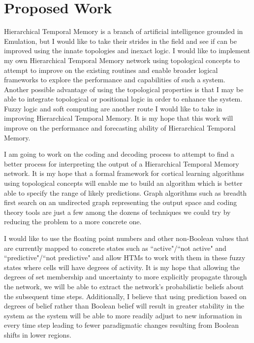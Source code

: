 \documentclass[oneside,12pt,openany]{book}
\begin{document}
	\section{Proposed Work}
	
	Hierarchical Temporal Memory is a branch of artificial intelligence grounded in Emulation, but I would like to take their strides in the field and see if can be improved using the innate topologies and inexact logic. I would like to implement my own Hierarchical Temporal Memory network using topological concepts to attempt to improve on the existing routines and enable broader logical frameworks to explore the performance and capabilities of such a system. Another possible advantage of using the topological properties is that I may be able to integrate topological or positional logic in order to enhance the system. Fuzzy logic and soft computing are another route I would like to take in improving Hierarchical Temporal Memory. It is my hope that this work will improve on the performance and forecasting ability of Hierarchical Temporal Memory.
	
	I am going to work on the coding and decoding process to attempt to find a better process for interpreting the output of a Hierarchical Temporal Memory network. It is my hope that a formal framework for cortical learning algorithms using topological concepts will enable me to build an algorithm which is better able to specify the range of likely predictions. Graph algorithms such as breadth first search on an undirected graph representing the output space and coding theory tools are just a few among the dozens of techniques we could try by reducing the problem to a more concrete one.
	
	I would like to use the floating point numbers and other non-Boolean values that are currently mapped to concrete states such as ``active"/``not active" and ``predictive"/``not predictive" and allow HTMs to work with them in these fuzzy states where cells will have degrees of activity. It is my hope that allowing the degrees of set membership and uncertainty to more explicitly propagate through the network, we will be able to extract the network's probabilistic beliefs about the subsequent time steps. Additionally, I believe that using prediction based on degrees of belief rather than Boolean belief will result in greater stability in the system as the system will be able to more readily adjust to new information in every time step leading to fewer paradigmatic changes resulting from Boolean shifts in lower regions.
	
\end{document}
